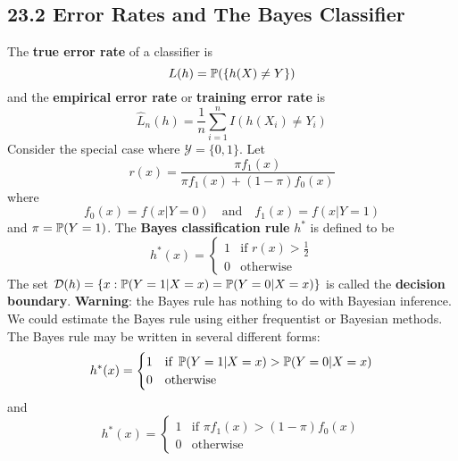 \subsection*{23.2 Error Rates and The Bayes Classifier}\label{error-rates-and-the-bayes-classifier}
The \textbf{true error rate} of a classifier is
\[
L(h) = \operatorname{\mathbb{P}}( \{ h(X) \neq Y\} )
\]
and the \textbf{empirical error rate} or \textbf{training error rate} is
\[
\hat{L}_{n}(h) = \frac{1}{n} \sum_{i=1}^{n} I(h(X_{i}) \neq Y_{i})
\]
Consider the special case where \(\mathcal{Y} = \{0, 1\}\). Let
\[
r(x) = \frac{\pi f_{1}(x)}{\pi f_{1}(x) + (1 - \pi) f_{0}(x)}
\]
where
\[
f_{0}(x) = f(x | Y = 0)
\quad \text{and} \quad
f_{1}(x) = f(x | Y = 1)
\]
and \(\pi = \operatorname{\mathbb{P}}(Y = 1)\).
The \textbf{Bayes classification rule} \(h^{*}\) is defined to be
\[
h^{*}(x) = \begin{cases}
1 & \text{if } r(x) > \frac{1}{2} \\
0 & \text{otherwise}
\end{cases}
\]
The set
\(\mathcal{D}(h) = \{ x : \operatorname{\mathbb{P}}(Y = 1 | X = x) = \operatorname{\mathbb{P}}(Y = 0 | X = x) \}\)
is called the \textbf{decision boundary}.
\textbf{Warning}: the Bayes rule has nothing to do with Bayesian
inference. We could estimate the Bayes rule using either frequentist or
Bayesian methods.
The Bayes rule may be written in several different forms:
\[
h^{*}(x) = \begin{cases}
1 & \text{if } \operatorname{\mathbb{P}}(Y = 1 | X = x) > \operatorname{\mathbb{P}}(Y = 0 | X  = x)\\
0 & \text{otherwise}
\end{cases}
\]
and
\[
h^{*}(x) = \begin{cases}
1 & \text{if } \pi f_{1}(x) > (1 - \pi) f_{0}(x) \\
0 & \text{otherwise}
\end{cases}
\]

